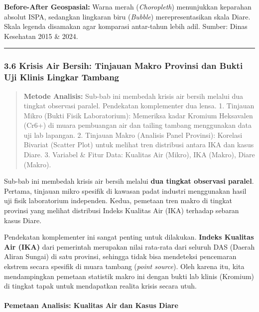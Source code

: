 \documentclass[
]{article}
\begin{document}
\textbf{Before-After Geospasial:} Warna merah (\emph{Choropleth})
menunjukkan keparahan absolut ISPA, sedangkan lingkaran biru
(\emph{Bubble}) merepresentasikan skala Diare. Skala legenda disamakan
agar komparasi antar-tahun lebih adil. Sumber: Dinas Kesehatan 2015 \&
2024.

\begin{center}\rule{0.5\linewidth}{0.5pt}\end{center}

\subsubsection{3.6 Krisis Air Bersih: Tinjauan Makro Provinsi dan Bukti
Uji Klinis Lingkar
Tambang}\label{krisis-air-bersih-tinjauan-makro-provinsi-dan-bukti-uji-klinis-lingkar-tambang}

\begin{quote}
\textbf{Metode Analisis:} Sub-bab ini membedah krisis air bersih melalui
dua tingkat observasi paralel. Pendekatan komplementer dua lensa. 1.
Tinjauan Mikro (Bukti Fisik Laboratorium): Memeriksa kadar Kromium
Heksavalen (Cr6+) di muara pembuangan air dan tailing tambang
menggunakan data uji lab lapangan. 2. Tinjauan Makro (Analisis Panel
Provinsi): Korelasi Bivariat (Scatter Plot) untuk melihat tren
distribusi antara IKA dan kasus Diare. 3. Variabel \& Fitur Data:
Kualitas Air (Mikro), IKA (Makro), Diare (Makro).
\end{quote}

Sub-bab ini membedah krisis air bersih melalui \textbf{dua tingkat
observasi paralel}. Pertama, tinjauan mikro spesifik di kawasan padat
industri menggunakan hasil uji fisik laboratorium independen. Kedua,
pemetaan tren makro di tingkat provinsi yang melihat distribusi Indeks
Kualitas Air (IKA) terhadap sebaran kasus Diare.

Pendekatan komplementer ini sangat penting untuk dilakukan.
\textbf{Indeks Kualitas Air (IKA)} dari pemerintah merupakan nilai
rata-rata dari seluruh DAS (Daerah Aliran Sungai) di satu provinsi,
sehingga tidak bisa mendeteksi pencemaran ekstrem secara spesifik di
muara tambang (\emph{point source}). Oleh karena itu, kita mendampingkan
pemetaan statistik makro ini dengan bukti lab klinis (Kromium) di
tingkat tapak untuk mendapatkan realita krisis secara utuh.

\paragraph{Pemetaan Analisis: Kualitas Air dan Kasus
Diare}\label{pemetaan-analisis-kualitas-air-dan-kasus-diare}
\end{document}
